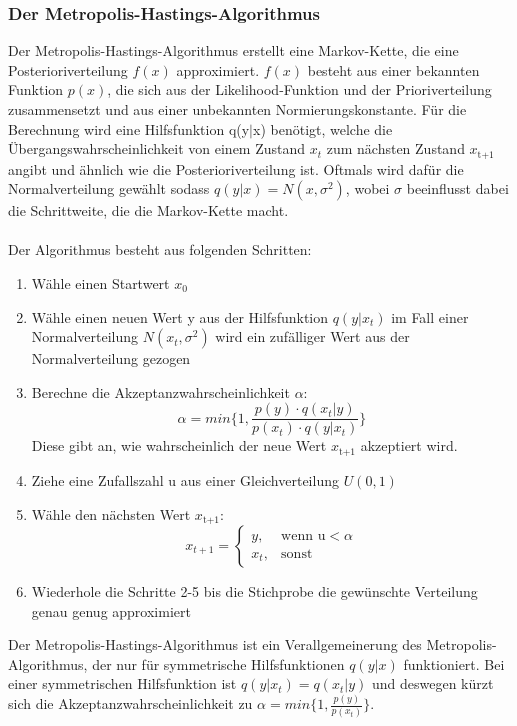 \documentclass[a4paper,12pt]{article}
\begin{document}
\subsubsection{Der Metropolis-Hastings-Algorithmus}
Der Metropolis-Hastings-Algorithmus erstellt eine Markov-Kette, die eine Posterioriverteilung $f(x)$ approximiert. $f(x)$ besteht aus einer bekannten Funktion $p(x)$, die sich aus der Likelihood-Funktion und der Prioriverteilung zusammensetzt und aus einer unbekannten Normierungskonstante. Für die Berechnung wird eine Hilfsfunktion q(y$|$x) benötigt, welche die Übergangswahrscheinlichkeit von einem Zustand $x_t$ zum nächsten Zustand $x_{\text{t+1}}$ angibt und ähnlich wie die Posterioriverteilung ist. Oftmals wird dafür die Normalverteilung gewählt sodass $q(y|x) = N(x,\sigma^2)$, wobei $\sigma$ beeinflusst dabei die Schrittweite, die die Markov-Kette macht. \parencite[226f.]{HandbookMonteCarloMethods} \\\\ 
Der Algorithmus besteht aus folgenden Schritten:
\begin{enumerate}
  \item Wähle einen Startwert $x_0$
  \item Wähle einen neuen Wert y aus der Hilfsfunktion $q(y|x_t)$ im Fall einer Normalverteilung $N(x_t,\sigma^2)$ wird ein zufälliger Wert aus der Normalverteilung gezogen
  \item Berechne die Akzeptanzwahrscheinlichkeit $\alpha$:
  \begin{equation}
    \alpha = min{\{1,\frac{p(y) \cdot q(x_t|y)}{p(x_t) \cdot q(y|x_t)}\}}
  \end{equation}
  Diese gibt an, wie wahrscheinlich der neue Wert $x_{\text{t+1}}$ akzeptiert wird.
  \item Ziehe eine Zufallszahl u aus einer Gleichverteilung $U(0,1)$
  \item Wähle den nächsten Wert $x_{\text{t+1}}$:
  \begin{equation}
    x_{t+1} = 
    \begin{cases}
      y, & \text{wenn u}< \alpha \\
      x_t, & \text{sonst}
    \end{cases}
  \end{equation}
  \item Wiederhole die Schritte 2-5 bis die Stichprobe die gewünschte Verteilung genau genug approximiert
\end{enumerate}
Der Metropolis-Hastings-Algorithmus ist ein Verallgemeinerung des Metropolis-Algorithmus, der nur für symmetrische Hilfsfunktionen $q(y|x)$ funktioniert. Bei einer symmetrischen Hilfsfunktion ist $q(y|x_t) = q(x_t|y)$ und deswegen kürzt sich die Akzeptanzwahrscheinlichkeit zu $\alpha = min{\{1,\frac{p(y)}{p(x_t)}\}}$. \parencite[226f.]{HandbookMonteCarloMethods} \\\\
\end{document}
